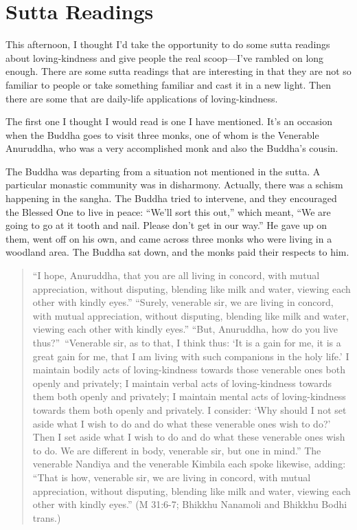 \chapter{Sutta Readings}

This afternoon, I thought I’d take the opportunity to do some sutta
readings about loving-kindness and give people the real scoop—I’ve
rambled on long enough. There are some sutta readings that are
interesting in that they are not so familiar to people or take something
familiar and cast it in a new light. Then there are some that are
daily-life applications of loving-kindness.

The first one I thought I would read is one I have mentioned. It’s an
occasion when the Buddha goes to visit three monks, one of whom is the
Venerable Anuruddha, who was a very accomplished monk and also the
Buddha’s cousin.

The Buddha was departing from a situation not mentioned in the sutta. A
particular monastic community was in disharmony. Actually, there was a
schism happening in the sangha. The Buddha tried to intervene, and they
encouraged the Blessed One to live in peace: “We’ll sort this out,”
which meant, “We are going to go at it tooth and nail. Please don’t get
in our way.” He gave up on them, went off on his own, and came across
three monks who were living in a woodland area. The Buddha sat down, and
the monks paid their respects to him.

\begin{quotation}
“I hope, Anuruddha, that you are all living in concord, with mutual
appreciation, without disputing, blending like milk and water, viewing
each other with kindly eyes.” “Surely, venerable sir, we are living in
concord, with mutual appreciation, without disputing, blending like milk
and water, viewing each other with kindly eyes.” “But, Anuruddha, how do
you live thus?”~“Venerable sir, as to that, I think thus: ‘It is a gain
for me, it is a great gain for me, that I am living with such companions
in the holy life.’ I maintain bodily acts of loving-kindness towards
those venerable ones both openly and privately; I maintain verbal acts
of loving-kindness towards them both openly and privately; I maintain
mental acts of loving-kindness towards them both openly and privately. I
consider: ‘Why should I not set aside what I wish to do and do what
these venerable ones wish to do?’ Then I set aside what I wish to do and
do what these venerable ones wish to do. We are different in body,
venerable sir, but one in mind.” The venerable Nandiya and the venerable
Kimbila each spoke likewise, adding: “That is how, venerable sir, we are
living in concord, with mutual appreciation, without disputing, blending
like milk and water, viewing each other with kindly eyes.” (M 31:6-7;
Bhikkhu Nanamoli and Bhikkhu Bodhi trans.)
\end{quotation}

